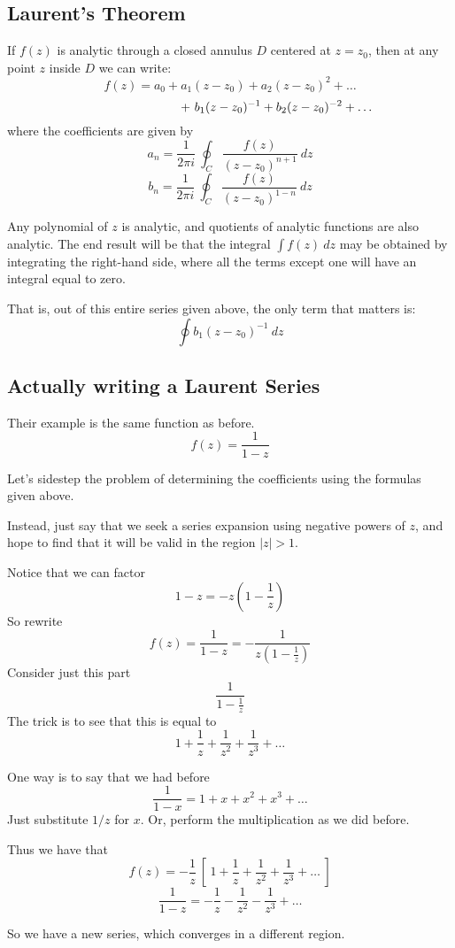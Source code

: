 \documentclass[11pt, oneside]{article}
\begin{document}
\subsection*{Laurent's Theorem}
If $f(z)$ is analytic through a closed annulus $D$ centered at $z = z_0$, then at any point $z$ inside $D$ we can write:
\[ f(z) = a_0 + a_1(z-z_0) + a_2(z-z_0)^2 + \dots \]
\[ \hspace{27mm} + \ b_1(z-z_0)^{-1} + b_2(z-z_0)^{-2} + \dots \]
where the coefficients are given by
\[ a_n = \frac{1}{2 \pi i} \ \oint_C \frac{f(z)}{(z - z_0)^{n+1}} \ dz \]
\[ b_n = \frac{1}{2 \pi i} \ \oint_C \frac{f(z)}{(z - z_0)^{1-n}} \ dz \]

Any polynomial of $z$ is analytic, and quotients of analytic functions are also analytic.  The end result will be that the integral $\int f(z) \ dz$ may be obtained by integrating the right-hand side, where all the terms except one will have an integral equal to zero.

That is, out of this entire series given above, the only term that matters is:
\[ \oint b_1(z-z_0)^{-1} \ dz \]

\subsection*{Actually writing a Laurent Series}
Their example is the same function as before.
\[ f(z) = \frac{1}{1-z} \]

Let's sidestep the problem of determining the coefficients using the formulas given above.

Instead, just say that we seek a series expansion using negative powers of $z$, and hope to find that it will be valid in the region $|z| > 1$.

Notice that we can factor
\[ 1 - z = -z (1 - \frac{1}{z}) \]
So rewrite
\[ f(z) = \frac{1}{1-z} = -\frac{1}{z (1 - \frac{1}{z})} \]
Consider just this part
\[ \frac{1}{1 - \frac{1}{z}} \]
The trick is to see that this is equal to 
\[ 1 + \frac{1}{z} + \frac{1}{z^2} + \frac{1}{z^3} + \dots \]

One way is to say that we had before
\[ \frac{1}{1 - x} = 1 + x + x^2 + x^3 + \dots \]
Just substitute $1/z$ for $x$.  Or, perform the multiplication as we did before.  

Thus we have that
\[ f(z) = -\frac{1}{z} \ [ \ 1 + \frac{1}{z} + \frac{1}{z^2} + \frac{1}{z^3} + \dots \ ] \]
\[ \frac{1}{1-z} = - \frac{1}{z} - \frac{1}{z^2} - \frac{1}{z^3} + \dots \]

So we have a new series, which converges in a different region.
\end{document}

